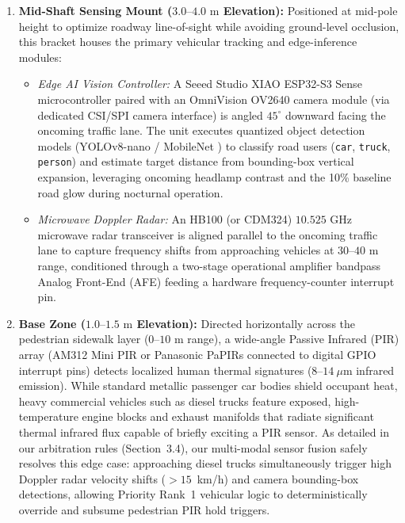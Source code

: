 \documentclass[11pt,a4paper]{article}
\begin{document}
\begin{enumerate}
    \item \textbf{Mid-Shaft Sensing Mount (\(3.0\text{--}4.0\text{ m}\) Elevation):} Positioned at mid-pole height to optimize roadway line-of-sight while avoiding ground-level occlusion, this bracket houses the primary vehicular tracking and edge-inference modules:
    \begin{itemize}
        \item \textit{Edge AI Vision Controller:} A Seeed Studio XIAO ESP32-S3 Sense microcontroller \cite{espressif_esp32s3} paired with an OmniVision OV2640 camera module (via dedicated CSI/SPI camera interface) is angled \(45^\circ\) downward facing the oncoming traffic lane. The unit executes quantized object detection models (YOLOv8-nano \cite{redmon_yolo} / MobileNet \cite{howard2017mobilenets}) to classify road users (\texttt{car}, \texttt{truck}, \texttt{person}) and estimate target distance from bounding-box vertical expansion, leveraging oncoming headlamp contrast and the 10\% baseline road glow during nocturnal operation.
        \item \textit{Microwave Doppler Radar:} An HB100 (or CDM324) \(10.525\text{ GHz}\) microwave radar transceiver is aligned parallel to the oncoming traffic lane to capture frequency shifts from approaching vehicles at \(30\text{--}40\text{ m}\) range, conditioned through a two-stage operational amplifier bandpass Analog Front-End (AFE) feeding a hardware frequency-counter interrupt pin.
    \end{itemize}
    \item \textbf{Base Zone (\(1.0\text{--}1.5\text{ m}\) Elevation):} Directed horizontally across the pedestrian sidewalk layer (\(0\text{--}10\text{ m}\) range), a wide-angle Passive Infrared (PIR) array (AM312 Mini PIR or Panasonic PaPIRs connected to digital GPIO interrupt pins) detects localized human thermal signatures (\(8\text{--}14~\mu\text{m}\) infrared emission). While standard metallic passenger car bodies shield occupant heat, heavy commercial vehicles such as diesel trucks feature exposed, high-temperature engine blocks and exhaust manifolds that radiate significant thermal infrared flux capable of briefly exciting a PIR sensor. As detailed in our arbitration rules (Section~3.4), our multi-modal sensor fusion safely resolves this edge case: approaching diesel trucks simultaneously trigger high Doppler radar velocity shifts (\(>15\)~km/h) and camera bounding-box detections, allowing Priority Rank~1 vehicular logic to deterministically override and subsume pedestrian PIR hold triggers.
\end{enumerate}
\end{document}

